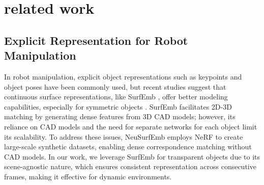 \section{related work}
\label{sec:relatedwork}

\subsection{Explicit Representation for Robot Manipulation}


In robot manipulation, explicit object representations such as keypoints \cite{mjeon-2022-ral} and object poses have been commonly used, but recent studies suggest that continuous surface representations, like SurfEmb \cite{haugaard2022surfemb}, offer better modeling capabilities, especially for symmetric objects \cite{haugaard2023multi}. SurfEmb facilitates 2D-3D matching by generating dense features from 3D CAD models; however, its reliance on CAD models and the need for separate networks for each object limit its scalability. To address these issues, NeuSurfEmb \cite{milano2024neusurfemb} employs \ac{NeRF} to create large-scale synthetic datasets, enabling dense correspondence matching without CAD models. In our work, we leverage SurfEmb for transparent objects due to its scene-agnostic nature, which ensures consistent representation across consecutive frames, making it effective for dynamic environments.

